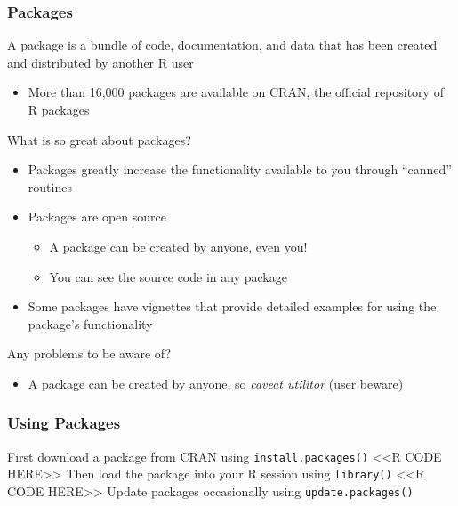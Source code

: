 \documentclass{beamer}
\begin{document}
\begin{frame}\frametitle{Packages}
    A package is a bundle of code, documentation, and data that has been created and distributed by another R user
    \begin{itemize}
        \item More than 16,000 packages are available on CRAN, the official repository of R packages 
    \end{itemize}
    \vspace{2ex}
    What is so great about packages?
    \begin{itemize}
        \item Packages greatly increase the functionality available to you through ``canned'' routines
        \item Packages are open source
        \begin{itemize}
            \item A package can be created by anyone, even you!
            \item You can see the source code in any package
        \end{itemize}
        \item Some packages have vignettes that provide detailed examples for using the package's functionality
    \end{itemize}
    \vspace{2ex}
    Any problems to be aware of?
    \begin{itemize}
        \item A package can be created by anyone, so \emph{caveat utilitor} (user beware)
    \end{itemize}
\end{frame}

\begin{frame}[fragile]\frametitle{Using Packages}
    First download a package from CRAN using \texttt{install.packages()}
    <<R CODE HERE>>
    \vspace{3ex}
    Then load the package into your R session using \texttt{library()}
    <<R CODE HERE>>
    \vspace{3ex}
    Update packages occasionally using \texttt{update.packages()}
\end{frame}
\end{document}
